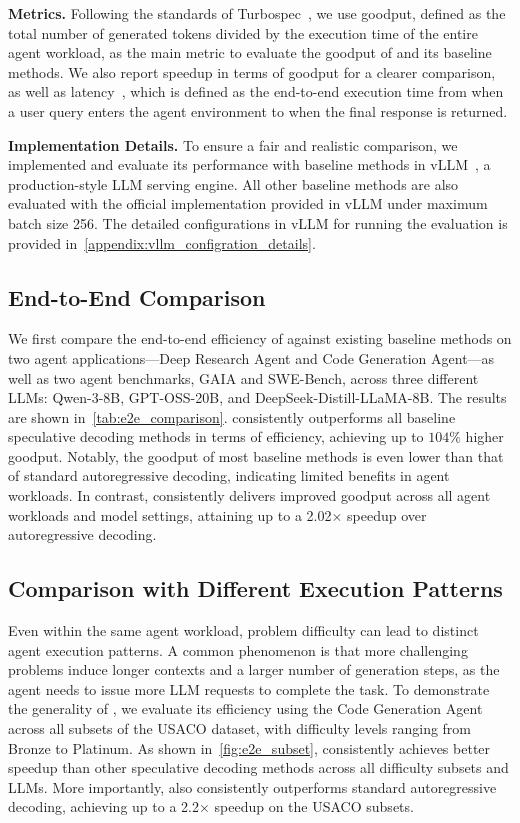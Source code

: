 \noindent\textbf{Metrics.} Following the standards of Turbospec~\citep{liu2024optimizing}, we use goodput, defined as the total number of generated tokens divided by the execution time of the entire agent workload, as the main metric to evaluate the goodput of \sysname and its baseline methods. We also report speedup in terms of goodput for a clearer comparison, as well as latency~\citep{DBLP:journals/corr/abs-2502-13965}, which is defined as the end-to-end execution time from when a user query enters the agent environment to when the final response is returned.

\noindent\textbf{Implementation Details.} To ensure a fair and realistic comparison, we implemented \sysname and evaluate its performance with baseline methods in vLLM~\citep{DBLP:conf/sosp/KwonLZ0ZY0ZS23}, a production-style LLM serving engine. All other baseline methods are also evaluated with the official implementation provided in vLLM under maximum batch size 256. The detailed configurations in vLLM for running the evaluation is provided in~\cref{appendix:vllm_configration_details}. 

\subsection{End-to-End Comparison}
\label{subsec:end_to_end_comparison}
We first compare the end-to-end efficiency of \sysname against existing baseline methods on two agent applications—Deep Research Agent and Code Generation Agent—as well as two agent benchmarks, GAIA and SWE-Bench, across three different LLMs: Qwen-3-8B, GPT-OSS-20B, and DeepSeek-Distill-LLaMA-8B.
The results are shown in~\cref{tab:e2e_comparison}. \sysname consistently outperforms all baseline speculative decoding methods in terms of efficiency, achieving up to $104\%$ higher goodput. Notably, the goodput of most baseline methods is even lower than that of standard autoregressive decoding, indicating limited benefits in agent workloads.
In contrast, \sysname consistently delivers improved goodput across all agent workloads and model settings, attaining up to a 2.02$\times$ speedup over autoregressive decoding.

\subsection{Comparison with Different Execution Patterns} Even within the same agent workload, problem difficulty can lead to distinct agent execution patterns. A common phenomenon is that more challenging problems induce longer contexts and a larger number of generation steps, as the agent needs to issue more LLM requests to complete the task. To demonstrate the generality of \sysname, we evaluate its efficiency using the Code Generation Agent across all subsets of the USACO dataset, with difficulty levels ranging from Bronze to Platinum. As shown in~\cref{fig:e2e_subset}, \sysname consistently achieves better speedup than other speculative decoding methods across all difficulty subsets and LLMs. More importantly, \sysname also consistently outperforms standard autoregressive decoding, achieving up to a 2.2$\times$ speedup on the USACO subsets.

